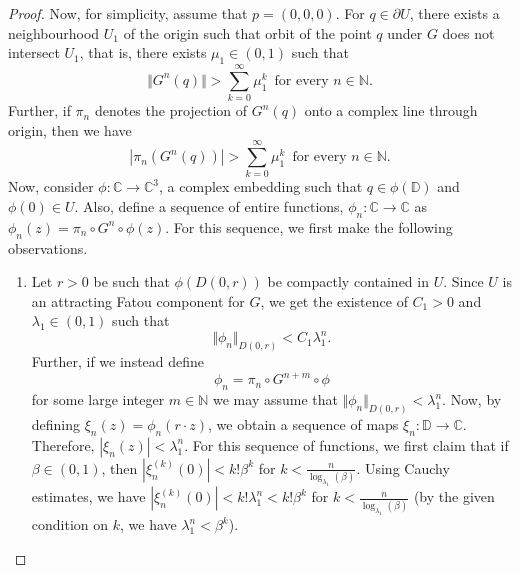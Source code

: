 \documentclass[12pt, reqno]{amsart}
\numberwithin{equation}{section}
\theoremstyle{definition}
\theoremstyle{remark}
\theoremstyle{plain}
\theoremstyle{definition}
\numberwithin{equation}{section}
\begin{document}
\begin{proof}
Now, for simplicity, assume that $p=(0,0,0)$. 
For $q\in\partial U$, there exists a 
neighbourhood $U_1$ of the origin such that orbit of the  point $q$ 
under $G$ does not intersect $U_1$, that is, 
there exists $\mu_1\in(0,1)$ such that
\[\Vert G^n(q)\Vert>\sum_{k=0}^{\infty}\mu_1^k \,\text{ for every }n\in\mathbb{N}.\]
Further, if $\pi_n$ denotes the projection of $G^n(q)$ onto a complex line through origin, then we have 
\[ |\pi_n(G^n(q))|>\sum_{k=0}^{\infty}\mu_1^k \,\text{ for every }n\in\mathbb{N}.\]
Now, consider $\phi:\mathbb{C}\to\mathbb{C}^3$, a complex embedding such that $q\in\phi(\mathbb{D})$ and $\phi(0)\in U$. Also, define a sequence of entire functions, $\phi_n:\mathbb{C}\to\mathbb{C}$ as $\phi_n(z)=\pi_n\circ G^n\circ\phi(z)$. For this sequence, we first make the following observations.
\begin{enumerate}
\item Let $r>0$ be such that $\phi(D(0,r))$ be compactly contained in $U$. Since $U$ is an attracting Fatou component for $G$, we get the existence of  $C_1>0$ and $\lambda_1\in(0,1)$ such that 
\[\Vert\phi_n\Vert_{D(0,r)}<C_1\lambda_1^n.\]
Further, if we instead define
\[\phi_n = \pi_n \circ G^{n+m}\circ\phi\]
for some large integer $m\in\mathbb{N}$ we may assume that
$\Vert\phi_n\Vert_{D(0,r)}<\lambda_1^n.$
Now, by defining  $\xi_n(z)= \phi_n(r · z)$, we obtain a sequence of maps $\xi_n:\mathbb{D}\to\mathbb{C}$. Therefore, $|\xi_n(z)|<\lambda_1^n$. For this sequence of functions, we first claim that if $\beta\in(0,1)$, then $|\xi_n^{(k)}(0)|<k!\beta^k$ for $k<\frac{n}{\log_{\lambda_1}(\beta)}$.
Using Cauchy estimates, we have $|\xi_n^{(k)}(0)|<k!\lambda_1^n<k!\beta^k$ for $k<\frac{n}{\log_{\lambda_1}(\beta)}$ (by the given condition on $k$, we have $\lambda_1^n<\beta^k$). 


\end{enumerate}
\end{proof}
\end{document}
